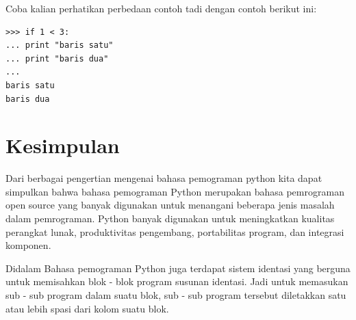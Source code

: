 \documentclass[12pt]{article}
\begin{document}
Coba kalian perhatikan perbedaan contoh tadi dengan contoh berikut ini:

\begin{verbatim}
>>> if 1 < 3:
... print "baris satu"
... print "baris dua"
...
baris satu
baris dua
\end{verbatim}

\section{Kesimpulan}
	Dari berbagai pengertian mengenai bahasa pemograman python kita dapat simpulkan bahwa bahasa pemograman Python merupakan bahasa pemrograman open source yang banyak digunakan untuk menangani beberapa jenis masalah dalam pemrograman. Python banyak digunakan untuk meningkatkan kualitas perangkat lunak, produktivitas pengembang, portabilitas program, dan integrasi komponen\cite{computingaplikasi}.
	
	Didalam Bahasa pemograman Python juga terdapat sistem identasi yang berguna untuk memisahkan blok - blok program susunan identasi. Jadi untuk memasukan sub - sub program dalam suatu blok, sub - sub program tersebut diletakkan satu atau lebih spasi dari kolom suatu blok\cite{kurniawan2011aplikasi}.
	
	
\end{document}
